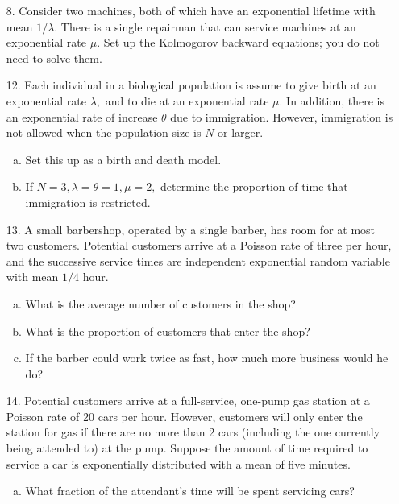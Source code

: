 \documentclass{article}
\begin{document}
\begin{itemize}
	\item[8.] Consider two machines, both of which have an exponential lifetime with mean $1/\lambda.$ There is a single repairman that can service machines at an exponential rate $\mu.$ Set up the Kolmogorov backward equations; you do not need to solve them.

	\item[12.]Each individual in a biological population is assume to give birth at an exponential rate $\lambda,$ and to die at an exponential rate $\mu.$ In addition, there is an exponential rate of increase $\theta$ due to immigration. However, immigration is not allowed when the population size is $N$ or larger.
		\begin{enumerate}[(a)]
			\item Set this up as a birth and death model.

			\item If $N=3, \lambda=\theta=1, \mu=2,$ determine the proportion of time that immigration is restricted.

		\end{enumerate}
	
	\item[13.] A small barbershop, operated by a single barber, has room for at most two customers. Potential customers arrive at a Poisson rate of three per hour, and the successive service times are independent exponential random variable with mean $1/4$ hour.
		\begin{enumerate}[(a)]
			\item What is the average number of customers in the shop?

			\item What is the proportion of customers that enter the shop?

			\item If the barber could work twice as fast, how much more business would he do?
				
		\end{enumerate}

	\item[14.] Potential customers arrive at a full-service, one-pump gas station at a Poisson rate of 20 cars per hour. However, customers will only enter the station for gas if there are no more than 2 cars (including the one currently being attended to) at the pump. Suppose the amount of time required to service a car is exponentially distributed with a mean of five minutes.
		\begin{enumerate}[(a)]
			\item What fraction of the attendant's time will be spent servicing cars?


\end{enumerate}
\end{itemize}
\end{document}
